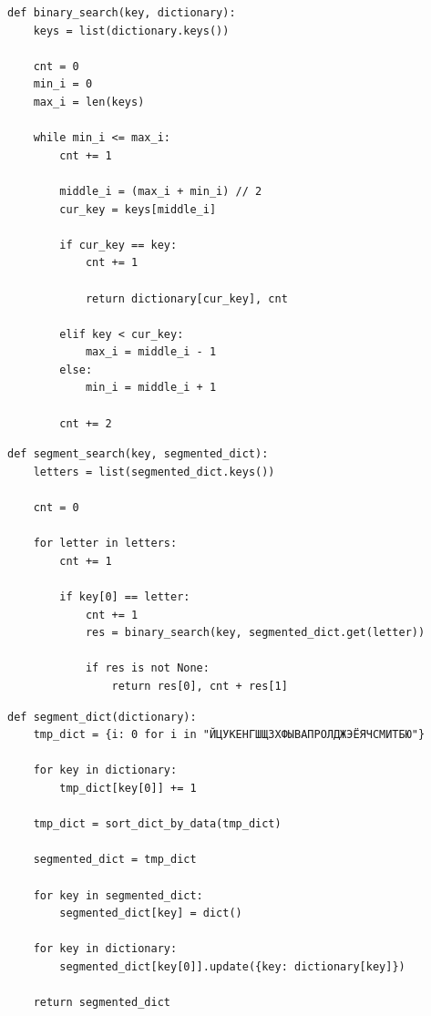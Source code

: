 \documentclass[a4paper,14pt, unknownkeysallowed]{extreport}
\begin{document}
\begin{center}
\captionsetup{justification=raggedright,singlelinecheck=off}
\begin{lstlisting}[label=lst:binary_search,caption=Алгоритм бинарного поиска]
def binary_search(key, dictionary):
    keys = list(dictionary.keys())

    cnt = 0
    min_i = 0
    max_i = len(keys)

    while min_i <= max_i:
        cnt += 1

        middle_i = (max_i + min_i) // 2
        cur_key = keys[middle_i]

        if cur_key == key:
            cnt += 1

            return dictionary[cur_key], cnt

        elif key < cur_key:
            max_i = middle_i - 1
        else:
            min_i = middle_i + 1

        cnt += 2
\end{lstlisting}
\end{center}

\clearpage

\begin{center}
\captionsetup{justification=raggedright,singlelinecheck=off}
\begin{lstlisting}[label=lst:segment_search,caption=Алгоритм поиска сегментами]
def segment_search(key, segmented_dict):
    letters = list(segmented_dict.keys())

    cnt = 0

    for letter in letters:
        cnt += 1  

        if key[0] == letter:
            cnt += 1  
            res = binary_search(key, segmented_dict.get(letter))

            if res is not None:
                return res[0], cnt + res[1]
\end{lstlisting}
\end{center}	

\begin{center}
\captionsetup{justification=raggedright,singlelinecheck=off}
\begin{lstlisting}[label=lst:segment_dict,caption=Функция создания словаря для использования поиска по нему сегментами]
def segment_dict(dictionary):
    tmp_dict = {i: 0 for i in "ЙЦУКЕНГШЩЗХФЫВАПРОЛДЖЭЁЯЧСМИТБЮ"}

    for key in dictionary:
        tmp_dict[key[0]] += 1

    tmp_dict = sort_dict_by_data(tmp_dict)

    segmented_dict = tmp_dict

    for key in segmented_dict:
        segmented_dict[key] = dict()

    for key in dictionary:
        segmented_dict[key[0]].update({key: dictionary[key]})

    return segmented_dict
\end{lstlisting}
\end{center}
\end{document}
